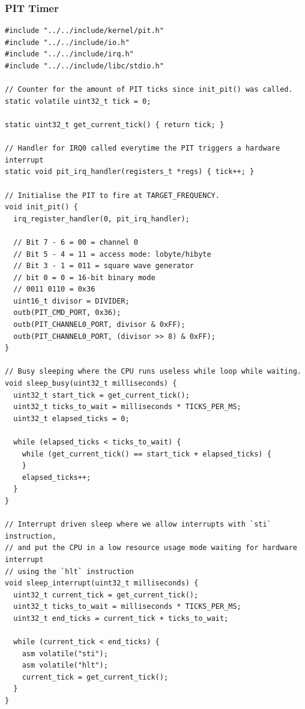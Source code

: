 \documentclass[../main.tex]{subfiles}
\begin{document}
\subsubsection{PIT Timer}
\label{apx:pit_timer}


\begin{listing}[H]
    \begin{verbatim}
#include "../../include/kernel/pit.h"
#include "../../include/io.h"
#include "../../include/irq.h"
#include "../../include/libc/stdio.h"

// Counter for the amount of PIT ticks since init_pit() was called.
static volatile uint32_t tick = 0;

static uint32_t get_current_tick() { return tick; }

// Handler for IRQ0 called everytime the PIT triggers a hardware interrupt
static void pit_irq_handler(registers_t *regs) { tick++; }

// Initialise the PIT to fire at TARGET_FREQUENCY.
void init_pit() {
  irq_register_handler(0, pit_irq_handler);

  // Bit 7 - 6 = 00 = channel 0
  // Bit 5 - 4 = 11 = access mode: lobyte/hibyte
  // Bit 3 - 1 = 011 = square wave generator
  // bit 0 = 0 = 16-bit binary mode
  // 0011 0110 = 0x36
  uint16_t divisor = DIVIDER;
  outb(PIT_CMD_PORT, 0x36);
  outb(PIT_CHANNEL0_PORT, divisor & 0xFF);
  outb(PIT_CHANNEL0_PORT, (divisor >> 8) & 0xFF);
}

// Busy sleeping where the CPU runs useless while loop while waiting.
void sleep_busy(uint32_t milliseconds) {
  uint32_t start_tick = get_current_tick();
  uint32_t ticks_to_wait = milliseconds * TICKS_PER_MS;
  uint32_t elapsed_ticks = 0;

  while (elapsed_ticks < ticks_to_wait) {
    while (get_current_tick() == start_tick + elapsed_ticks) {
    }
    elapsed_ticks++;
  }
}

// Interrupt driven sleep where we allow interrupts with `sti` instruction,
// and put the CPU in a low resource usage mode waiting for hardware interrupt
// using the `hlt` instruction
void sleep_interrupt(uint32_t milliseconds) {
  uint32_t current_tick = get_current_tick();
  uint32_t ticks_to_wait = milliseconds * TICKS_PER_MS;
  uint32_t end_ticks = current_tick + ticks_to_wait;

  while (current_tick < end_ticks) {
    asm volatile("sti");
    asm volatile("hlt");
    current_tick = get_current_tick();
  }
}
    \end{verbatim}
    \caption{Implementation of \texttt{pit.c}}
    \label{lst:pit_c}
\end{listing}
\end{document}
